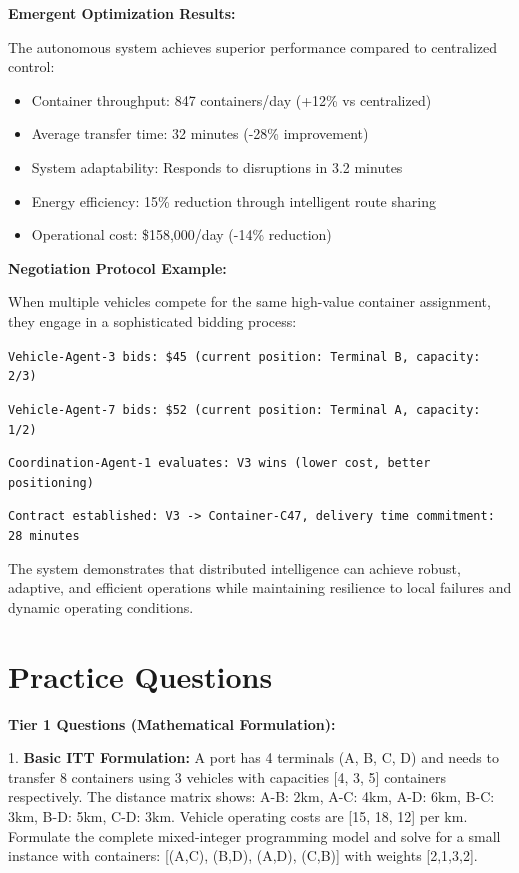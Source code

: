 \documentclass{article}
\begin{document}
\textbf{Emergent Optimization Results:}

The autonomous system achieves superior performance compared to centralized control:
\begin{itemize}
\item Container throughput: 847 containers/day (+12\% vs centralized)
\item Average transfer time: 32 minutes (-28\% improvement)
\item System adaptability: Responds to disruptions in 3.2 minutes
\item Energy efficiency: 15\% reduction through intelligent route sharing
\item Operational cost: \$158,000/day (-14\% reduction)
\end{itemize}

\textbf{Negotiation Protocol Example:}

When multiple vehicles compete for the same high-value container assignment, they engage in a sophisticated bidding process:

\texttt{Vehicle-Agent-3 bids: \$45 (current position: Terminal B, capacity: 2/3)}

\texttt{Vehicle-Agent-7 bids: \$52 (current position: Terminal A, capacity: 1/2)}

\texttt{Coordination-Agent-1 evaluates: V3 wins (lower cost, better positioning)}

\texttt{Contract established: V3 -> Container-C47, delivery time commitment: 28 minutes}

The system demonstrates that distributed intelligence can achieve robust, adaptive, and efficient operations while maintaining resilience to local failures and dynamic operating conditions.

\section{Practice Questions}

\textbf{Tier 1 Questions (Mathematical Formulation):}

1. \textbf{Basic ITT Formulation:} A port has 4 terminals (A, B, C, D) and needs to transfer 8 containers using 3 vehicles with capacities [4, 3, 5] containers respectively. The distance matrix shows: A-B: 2km, A-C: 4km, A-D: 6km, B-C: 3km, B-D: 5km, C-D: 3km. Vehicle operating costs are [15, 18, 12] per km. Formulate the complete mixed-integer programming model and solve for a small instance with containers: [(A,C), (B,D), (A,D), (C,B)] with weights [2,1,3,2].
\end{document}
